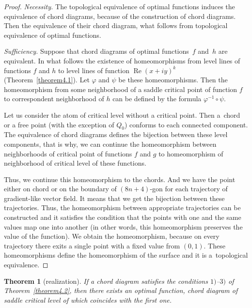 \documentclass[10pt,a4paper]{amsart}
\numberwithin{equation}{section}
\newtheorem{Theorem}{Theorem}[section]
\begin{document}
\begin{proof}
\emph{Necessity.} The topological equivalence of optimal functions induces the equivalence of chord diagrams, because of the construction of chord diagrams. Then the equivalence of their chord diagram, what follows from topological equivalence of optimal functions.

\emph{Sufficiency.} Suppose that chord diagrams of optimal functions~$f$ and~$h$ are equivalent. In what follows the existence of homeomorphisms from level lines of functions $f$ and $h$ to level lines of function $\operatorname{Re}(x+iy)^{k}$ (Theorem~\ref{theorem4.1}). Let $\varphi$ and $\psi$ be these homeomorphisms. Then the homeomorphism from some neighborhood of a saddle critical point of function $f$ to correspondent neighborhood of $h$ can be def\/ined by the formula $\varphi^{-1}\circ\psi$.

Let us consider the atom of critical level without a critical point. Then a~chord or a free point (with the exception of $Q_0$) conforms to each connected component. The equivalence of chord diagrams def\/ines the bijection between these level components, that is why, we can continue the homeomorphism between neighborhoods of critical point of functions $f$ and $g$ to homeomorphism of neighborhood of critical level of these functions.

Thus, we continue this homeomorphism to the chords. And we have the point either on chord or on the boundary of $(8n+4)$-gon for each trajectory of gradient-like vector f\/ield. It means that we get the bijection between these trajectories. Thus, the homeomorphism between appropriate trajectories can be constructed and it satisf\/ies the condition that the points with one and the same values map one into another (in other words, this homeomorphism preserves the value of the function). We obtain the homeomorphism, because on every trajectory there exits a single point with a f\/ixed value from $(0,1)$. These homeomorphisms def\/ine the homeomorphism of the surface and it is a~topological equivalence.
\end{proof}


\begin{Theorem}[realization]\label{theorem4.4}
If a chord diagram satisfies the conditions $1)$--$3)$ of Theorem~{\rm \ref{theorem4.2}}, then there exists an optimal function, chord diagram of saddle critical level of which coincides with the first one.
\end{Theorem}
\end{document}
